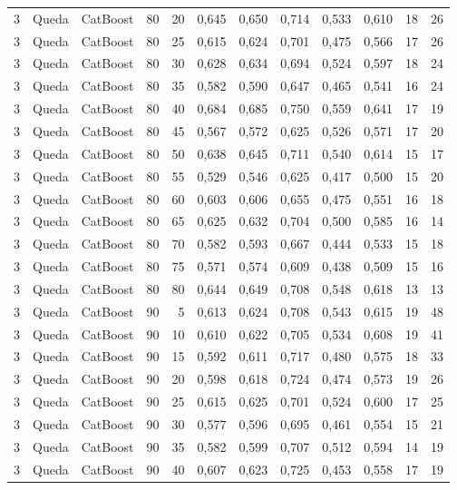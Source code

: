 \begin{longtable}{@{}rllrrrrrrrrr@{}}
3 & Queda & CatBoost & 80 & 20 & 0,645 & 0,650 & 0,714 & 0,533 & 0,610 & 18 & 26 \\
3 & Queda & CatBoost & 80 & 25 & 0,615 & 0,624 & 0,701 & 0,475 & 0,566 & 17 & 26 \\
3 & Queda & CatBoost & 80 & 30 & 0,628 & 0,634 & 0,694 & 0,524 & 0,597 & 18 & 24 \\
3 & Queda & CatBoost & 80 & 35 & 0,582 & 0,590 & 0,647 & 0,465 & 0,541 & 16 & 24 \\
3 & Queda & CatBoost & 80 & 40 & 0,684 & 0,685 & 0,750 & 0,559 & 0,641 & 17 & 19 \\
3 & Queda & CatBoost & 80 & 45 & 0,567 & 0,572 & 0,625 & 0,526 & 0,571 & 17 & 20 \\
3 & Queda & CatBoost & 80 & 50 & 0,638 & 0,645 & 0,711 & 0,540 & 0,614 & 15 & 17 \\
3 & Queda & CatBoost & 80 & 55 & 0,529 & 0,546 & 0,625 & 0,417 & 0,500 & 15 & 20 \\
3 & Queda & CatBoost & 80 & 60 & 0,603 & 0,606 & 0,655 & 0,475 & 0,551 & 16 & 18 \\
3 & Queda & CatBoost & 80 & 65 & 0,625 & 0,632 & 0,704 & 0,500 & 0,585 & 16 & 14 \\
3 & Queda & CatBoost & 80 & 70 & 0,582 & 0,593 & 0,667 & 0,444 & 0,533 & 15 & 18 \\
3 & Queda & CatBoost & 80 & 75 & 0,571 & 0,574 & 0,609 & 0,438 & 0,509 & 15 & 16 \\
3 & Queda & CatBoost & 80 & 80 & 0,644 & 0,649 & 0,708 & 0,548 & 0,618 & 13 & 13 \\
3 & Queda & CatBoost & 90 & 5 & 0,613 & 0,624 & 0,708 & 0,543 & 0,615 & 19 & 48 \\
3 & Queda & CatBoost & 90 & 10 & 0,610 & 0,622 & 0,705 & 0,534 & 0,608 & 19 & 41 \\
3 & Queda & CatBoost & 90 & 15 & 0,592 & 0,611 & 0,717 & 0,480 & 0,575 & 18 & 33 \\
3 & Queda & CatBoost & 90 & 20 & 0,598 & 0,618 & 0,724 & 0,474 & 0,573 & 19 & 26 \\
3 & Queda & CatBoost & 90 & 25 & 0,615 & 0,625 & 0,701 & 0,524 & 0,600 & 17 & 25 \\
3 & Queda & CatBoost & 90 & 30 & 0,577 & 0,596 & 0,695 & 0,461 & 0,554 & 15 & 21 \\
3 & Queda & CatBoost & 90 & 35 & 0,582 & 0,599 & 0,707 & 0,512 & 0,594 & 14 & 19 \\
3 & Queda & CatBoost & 90 & 40 & 0,607 & 0,623 & 0,725 & 0,453 & 0,558 & 17 & 19 \\

\end{longtable}

